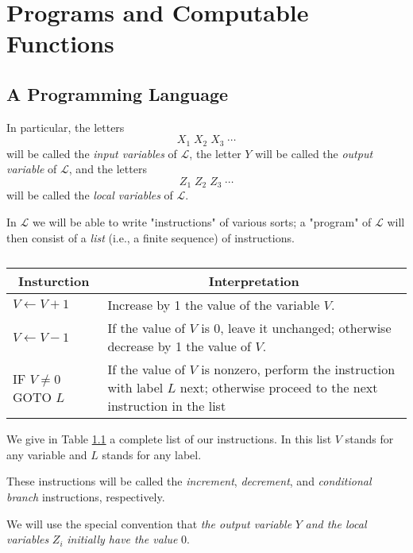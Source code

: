 \documentclass[12pt,a4paper,twoside,openany]{book}
\begin{document}
\chapter{Programs and Computable Functions}
\section{A Programming Language}

In particular, the letters $$X_1\;X_2\;X_3\;\cdots$$ will be called the \textit{input variables} of $\mathscr{L}$, the letter $Y$ will be called the \textit{output variable} of $\mathscr{L}$, and the letters $$Z_1\;Z_2\;Z_3\;\cdots$$ will be called the \textit{local variables} of $\mathscr{L}$.

In $\mathscr{L}$ we will be able to write "instructions" of various sorts; a "program" of $\mathscr{L}$ will then consist of a \textit{list} (i.e., a finite sequence) of instructions.

\begin{table}[htbp]
    \caption{}
    \begin{tabular}{p{}p{}}
        \toprule
        \multicolumn{1}{c}{Insturction} & \multicolumn{1}{c}{Interpretation}                                                                                       \\
        \midrule
        $V\leftarrow V+1$     & Increase by 1 the value of the variable $V$.                                                                                       \\
        $V\leftarrow V-1$     & If the value of $V$ is 0, leave it unchanged; otherwise decrease by 1 the value of $V$.                                            \\
        IF $V\neq 0$ GOTO $L$ & If the value of $V$ is nonzero, perform the instruction with label $L$ next; otherwise proceed to the next instruction in the list \\
        \bottomrule
    \end{tabular}
    \label{table:1.1}
\end{table}

We give in Table \ref{table:1.1} a complete list of our instructions. In this list $V$ stands for any variable and $L$ stands for any label.

These instructions will be called the \textit{increment}, \textit{decrement}, and \textit{conditional branch} instructions, respectively.

We will use the special convention that \textit{the output variable} $Y$ \textit{and the local variables} $Z_i$ \textit{initially have the value} 0.
\end{document}
